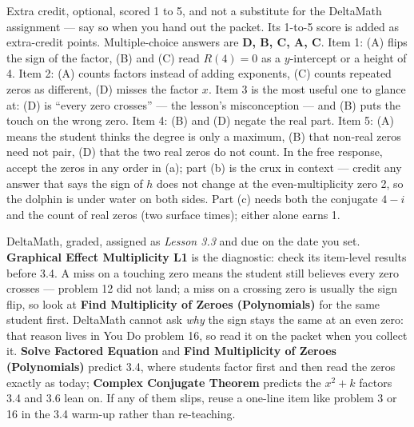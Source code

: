 \documentclass[10pt]{article}
\begin{document}
\begin{teachernote}[AP Practice]
Extra credit, optional, scored 1 to 5, and not a substitute for the DeltaMath assignment ---
say so when you hand out the packet. Its 1-to-5 score is added as extra-credit points.
Multiple-choice answers are \textbf{D, B, C, A, C}. Item 1: (A) flips the sign of the factor,
(B) and (C) read $R(4) = 0$ as a $y$-intercept or a height of 4. Item 2: (A) counts factors
instead of adding exponents, (C) counts repeated zeros as different, (D) misses the factor $x$.
Item 3 is the most useful one to glance at: (D) is ``every zero crosses'' --- the lesson's
misconception --- and (B) puts the touch on the wrong zero. Item 4: (B) and (D) negate the real
part. Item 5: (A) means the student thinks the degree is only a maximum, (B) that non-real
zeros need not pair, (D) that the two real zeros do not count. In the free response, accept
the zeros in any order in (a); part (b) is the crux in context --- credit any answer that says
the sign of $h$ does not change at the even-multiplicity zero 2, so the dolphin is under water
on both sides. Part (c) needs both the conjugate $4 - i$ and the count of real zeros (two
surface times); either alone earns 1.
\end{teachernote}

\begin{teachernote}[Homework]
DeltaMath, graded, assigned as \textit{Lesson 3.3} and due on the date you set.
\textbf{Graphical Effect Multiplicity L1} is the diagnostic: check its item-level results
before 3.4. A miss on a touching zero means the student still believes every zero crosses ---
problem 12 did not land; a miss on a crossing zero is usually the sign flip, so look at
\textbf{Find Multiplicity of Zeroes (Polynomials)} for the same student first. DeltaMath cannot
ask \emph{why} the sign stays the same at an even zero: that reason lives in You Do problem 16,
so read it on the packet when you collect it. \textbf{Solve Factored Equation} and
\textbf{Find Multiplicity of Zeroes (Polynomials)} predict 3.4, where students factor first and
then read the zeros exactly as today; \textbf{Complex Conjugate Theorem} predicts the
$x^2 + k$ factors 3.4 and 3.6 lean on. If any of them slips, reuse a one-line item like
problem 3 or 16 in the 3.4 warm-up rather than re-teaching.
\end{teachernote}
\end{document}

